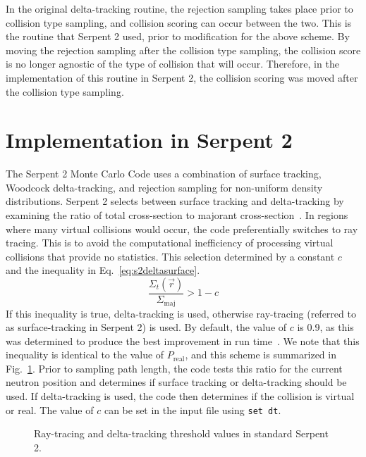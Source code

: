 In the original delta-tracking routine, the rejection sampling takes
place prior to collision type sampling, and collision scoring can
occur between the two. This is the routine that Serpent 2 used, prior
to modification for the above scheme. By moving the rejection sampling
after the collision type sampling, the collision score is no longer
agnostic of the type of collision that will occur. Therefore, in the
implementation of this routine in Serpent 2, the collision scoring was
moved after the collision type sampling.

\section{Implementation in Serpent 2}
\label{sec:implementation}

The Serpent 2 Monte Carlo Code uses a combination of surface tracking,
Woodcock delta-tracking, and rejection sampling for non-uniform
density distributions. Serpent 2 selects between surface tracking and
delta-tracking by examining the ratio of total cross-section to
majorant cross-section~\cite{leppanen2010}. In regions where many
virtual collisions would occur, the code preferentially switches to
ray tracing. This is to avoid the computational inefficiency of
processing virtual collisions that provide no statistics. This selection
determined by a constant $c$ and the inequality in
Eq.~\eqref{eq:s2deltasurface}.
\begin{equation}
  \label{eq:s2deltasurface}
  \frac{\Sigma_t(\vec{r})}{\Sigma_\mathrm{maj}} > 1 - c
\end{equation}
If this inequality is true, delta-tracking is used, otherwise
ray-tracing (referred to as surface-tracking in Serpent 2) is used. By
default, the value of $c$ is 0.9, as this was determined to produce
the best improvement in run time~\cite{leppanen2010}. We note that
this inequality is identical to the value of $P_\mathrm{real}$, and
this scheme is summarized in Fig.~\ref{fig:ray_wdt_normal}.  Prior to
sampling path length, the code tests this ratio for the current
neutron position and determines if surface tracking or delta-tracking
should be used. If delta-tracking is used, the code then determines if
the collision is virtual or real. The value of $c$ can be set in the
input file using \verb|set dt|.
\begin{figure}[hbtp]\centering
  \caption{Ray-tracing and delta-tracking threshold values in
    standard Serpent 2.}
  \label{fig:ray_wdt_normal}
\end{figure}

